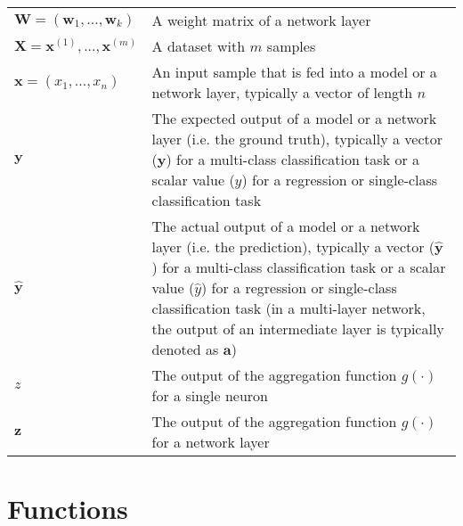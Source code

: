 \begin{tabular}{ p{3cm} p{11cm} }
	$\boldsymbol{W} = (\boldsymbol{w}_1, ..., \boldsymbol{w}_k)$ & A weight matrix of a network layer\\
	$\boldsymbol{X} = \boldsymbol{x}^{(1)}, ..., \boldsymbol{x}^{(m)}$ & A dataset with $m$ samples\\
	$\boldsymbol{x} = (x_1, ..., x_n)$ & An input sample that is fed into a model or a network layer, typically a vector of length $n$\\
	$\boldsymbol{y}$ & The expected output of a model or a network layer (i.e. the ground truth), typically a vector ($\boldsymbol{y}$) for a multi-class classification task or a scalar value ($y$) for a regression or single-class classification task\\
	$\boldsymbol{\hat{y}}$ & The actual output of a model or a network layer (i.e. the prediction), typically a vector ($\boldsymbol{\hat{y}}$) for a multi-class classification task or a scalar value ($\hat{y}$) for a regression or single-class classification task (in a multi-layer network, the output of an intermediate layer is typically denoted as $\boldsymbol{a}$)\\
	$z$ & The output of the aggregation function $g(\cdot)$ for a single neuron\\
	$\boldsymbol{z}$ & The output of the aggregation function $g(\cdot)$ for a network layer\\
\end{tabular}


\section{Functions}

